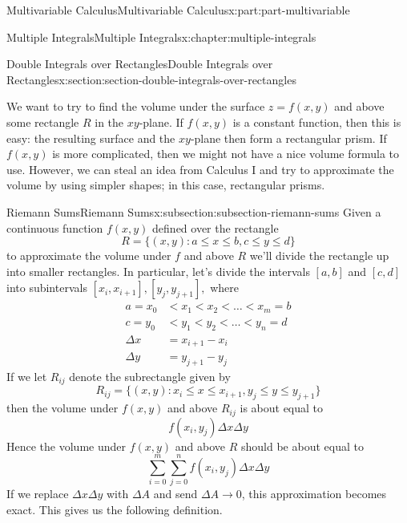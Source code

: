 \documentclass[twoside,10pt,]{book}
\numberwithin{equation}{part}
\begin{document}
\begin{partptx}{Multivariable Calculus}{}{Multivariable Calculus}{}{}{x:part:part-multivariable}
\begin{chapterptx}{Multiple Integrals}{}{Multiple Integrals}{}{}{x:chapter:multiple-integrals}
\begin{sectionptx}{Double Integrals over Rectangles}{}{Double Integrals over Rectangles}{}{}{x:section:section-double-integrals-over-rectangles}
\begin{introduction}{}%
We want to try to find the volume under the surface \(z = f(x,y)\) and above some rectangle \(R\) in the \(xy\)-plane. If \(f(x,y)\) is a constant function, then this is easy: the resulting surface and the \(xy\)-plane then form a rectangular prism. If \(f(x,y)\) is more complicated, then we might not have a nice volume formula to use. However, we can steal an idea from Calculus I and try to approximate the volume by using simpler shapes; in this case, rectangular prisms.%
\end{introduction}%
%
%
\typeout{************************************************}
\typeout{************************************************}
%
\begin{subsectionptx}{Riemann Sums}{}{Riemann Sums}{}{}{x:subsection:subsection-riemann-sums}
Given a continuous function \(f(x,y)\) defined over the rectangle%
\begin{equation*}
R = \{(x,y) : a\leq x\leq b, c\leq y\leq d\}
\end{equation*}
to approximate the volume under \(f\) and above \(R\) we'll divide the rectangle up into smaller rectangles. In particular, let's divide the intervals \([a,b]\) and \([c,d]\) into subintervals \([x_{i},x_{i+1}], [y_{j},y_{j+1}],\) where%
\begin{align*}
a = x_{0} & < x_{1} < x_{2} < \dots < x_{m} = b \\
c = y_{0} & < y_{1} < y_{2} < \dots < y_{n} = d \\
\Delta x & = x_{i+1} - x_{i} \\
\Delta y & = y_{j+1} - y_{j} 
\end{align*}
If we let \(R_{ij}\) denote the subrectangle given by%
\begin{equation*}
R_{ij} = \{(x,y) : x_{i}\leq x\leq x_{i+1}, y_{j}\leq y\leq y_{j+1}\}
\end{equation*}
then the volume under \(f(x,y)\) and above \(R_{ij}\) is about equal to%
\begin{equation*}
f(x_{i},y_{j})\Delta x\Delta y
\end{equation*}
Hence the volume under \(f(x,y)\) and above \(R\) should be about equal to%
\begin{equation*}
\sum_{i=0}^{m}\sum_{j=0}^{n}f(x_{i},y_{j})\Delta x\Delta y
\end{equation*}
If we replace \(\Delta x\Delta y\) with \(\Delta A\) and send \(\Delta A\to0\), this approximation becomes exact. This gives us the following definition.%

\end{subsectionptx}
\end{sectionptx}
\end{chapterptx}
\end{partptx}
\end{document}
